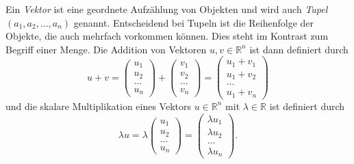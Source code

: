 Ein \textit{Vektor} ist eine geordnete Aufz\"ahlung von Objekten und wird auch \textit{Tupel} $(a_1, a_2,\dots,a_n)$ genannt. Entscheidend bei Tupeln ist die Reihenfolge der Objekte, die auch mehrfach vorkommen k\"onnen. Dies steht im Kontrast zum Begriff einer Menge. Die Addition von Vektoren $u, v\in\mathbb{R}^n$ ist dann definiert durch
\begin{equation*}
u + v = \begin{pmatrix} u_1 \\ u_2 \\ \dots \\ u_n \end{pmatrix} + \begin{pmatrix} v_1 \\ v_2 \\ \dots \\ v_n \end{pmatrix} = \begin{pmatrix} u_1 + v_1 \\ u_1+v_2 \\ \dots \\ u_1+v_n \end{pmatrix}
\end{equation*} 
und die skalare Multiplikation eines Vektors $u\in\mathbb{R}^n$ mit $\lambda\in\mathbb{R}$ ist definiert durch
\begin{equation*}
\lambda u = \lambda \begin{pmatrix} u_1 \\ u_2 \\ \dots \\ u_n \end{pmatrix} = \begin{pmatrix} \lambda u_1 \\ \lambda u_2 \\ \dots \\ \lambda u_n \end{pmatrix}.
\end{equation*}



